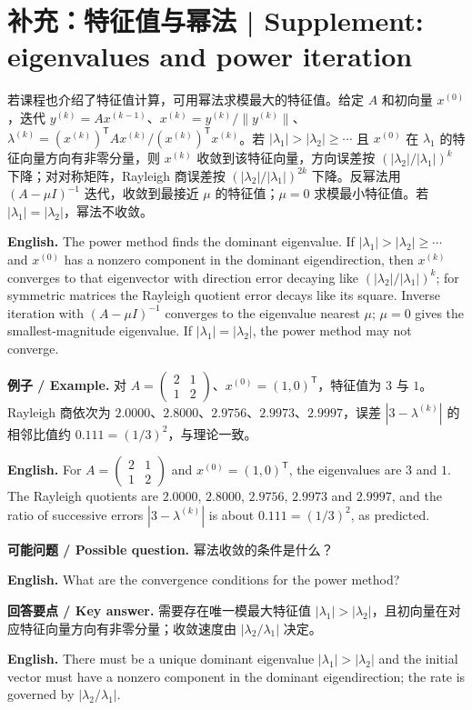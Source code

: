 \documentclass[UTF8,11pt,a4paper]{ctexart}
\newcommand{\EN}[1]{\par\noindent\textbf{English.} #1\par}
\newcommand{\EX}[2]{\par\noindent\textbf{例子 / Example.} #1\par\EN{#2}}
\newcommand{\ASK}[4]{\par\noindent\textbf{可能问题 / Possible question.} #1\par\EN{#2}\noindent\textbf{回答要点 / Key answer.} #3\par\EN{#4}\medskip}
\begin{document}
\section{补充：特征值与幂法 | Supplement: eigenvalues and power iteration}
\noindent 若课程也介绍了特征值计算，可用幂法求模最大的特征值。给定 $A$ 和初向量 $x^{(0)}$，迭代 $y^{(k)}=Ax^{(k-1)}$、$x^{(k)}=y^{(k)}/\|y^{(k)}\|$、$\lambda^{(k)}=(x^{(k)})^{\mathsf T}Ax^{(k)}/(x^{(k)})^{\mathsf T}x^{(k)}$。若 $|\lambda_1|>|\lambda_2|\ge\cdots$ 且 $x^{(0)}$ 在 $\lambda_1$ 的特征向量方向有非零分量，则 $x^{(k)}$ 收敛到该特征向量，方向误差按 $(|\lambda_2|/|\lambda_1|)^k$ 下降；对对称矩阵，Rayleigh 商误差按 $(|\lambda_2|/|\lambda_1|)^{2k}$ 下降。反幂法用 $(A-\mu I)^{-1}$ 迭代，收敛到最接近 $\mu$ 的特征值；$\mu=0$ 求模最小特征值。若 $|\lambda_1|=|\lambda_2|$，幂法不收敛。
\EN{The power method finds the dominant eigenvalue. If $|\lambda_1|>|\lambda_2|\ge\cdots$ and $x^{(0)}$ has a nonzero component in the dominant eigendirection, then $x^{(k)}$ converges to that eigenvector with direction error decaying like $(|\lambda_2|/|\lambda_1|)^k$; for symmetric matrices the Rayleigh quotient error decays like its square. Inverse iteration with $(A-\mu I)^{-1}$ converges to the eigenvalue nearest $\mu$; $\mu=0$ gives the smallest-magnitude eigenvalue. If $|\lambda_1|=|\lambda_2|$, the power method may not converge.}
\EX{对 $A=\begin{pmatrix}2&1\\1&2\end{pmatrix}$、$x^{(0)}=(1,0)^{\mathsf T}$，特征值为 $3$ 与 $1$。Rayleigh 商依次为 $2.0000$、$2.8000$、$2.9756$、$2.9973$、$2.9997$，误差 $|3-\lambda^{(k)}|$ 的相邻比值约 $0.111=(1/3)^2$，与理论一致。}{For $A=\begin{pmatrix}2&1\\1&2\end{pmatrix}$ and $x^{(0)}=(1,0)^{\mathsf T}$, the eigenvalues are $3$ and $1$. The Rayleigh quotients are $2.0000$, $2.8000$, $2.9756$, $2.9973$ and $2.9997$, and the ratio of successive errors $|3-\lambda^{(k)}|$ is about $0.111=(1/3)^2$, as predicted.}
\ASK{幂法收敛的条件是什么？}{What are the convergence conditions for the power method?}{需要存在唯一模最大特征值 $|\lambda_1|>|\lambda_2|$，且初向量在对应特征向量方向有非零分量；收敛速度由 $|\lambda_2/\lambda_1|$ 决定。}{There must be a unique dominant eigenvalue $|\lambda_1|>|\lambda_2|$ and the initial vector must have a nonzero component in the dominant eigendirection; the rate is governed by $|\lambda_2/\lambda_1|$.}
\end{document}
